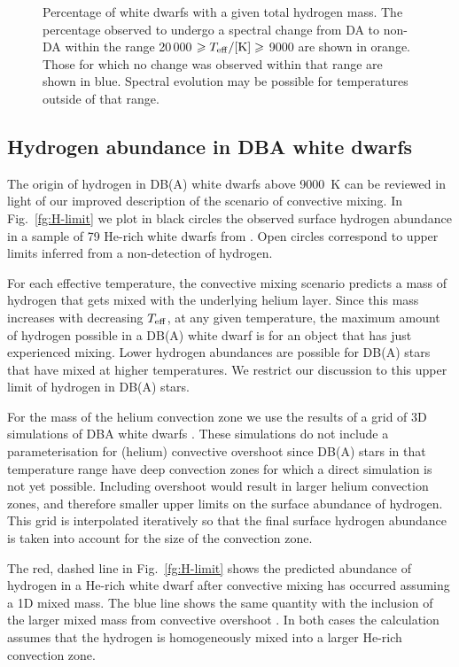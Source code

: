\documentclass[a4paper,fleqn,usenatbib]{mnras}
\begin{document}
\begin{figure}
 \centering
 \caption{Percentage of white dwarfs with a given total hydrogen mass. The percentage observed to undergo a spectral change from DA to non-DA within the range 20\,000 $\geqslant T_{\rm eff}/{\rm[K]} \geqslant$ 9000 are shown in orange. Those for which no change was observed within that range are shown in blue. Spectral evolution may be possible for temperatures outside of that range. }
 \label{fg:chunky-mass}
\end{figure}

\subsection{Hydrogen abundance in DBA white dwarfs}

The origin of hydrogen in DB(A) white dwarfs above 9000~K \citep{rolland18} can be reviewed in light of our improved description of the scenario of convective mixing. In Fig.~\ref{fg:H-limit} we plot in black circles the observed surface hydrogen abundance in a sample of 79 He-rich white dwarfs from \citet{rolland18}. Open circles correspond to upper limits inferred from a non-detection of hydrogen.

For each effective temperature, the convective mixing scenario predicts a mass of hydrogen that gets mixed with the underlying helium layer. Since this mass increases with decreasing $T_{\rm eff}$, at any given temperature, the maximum amount of hydrogen possible in a DB(A) white dwarf is for an object that has just experienced mixing. Lower hydrogen abundances are possible for DB(A) stars that have mixed at higher temperatures. We restrict our discussion to this upper limit of hydrogen in DB(A) stars.

For the mass of the helium convection zone we use the results of a grid of 3D simulations of DBA white dwarfs \citep{elena2}. These simulations do not include a parameterisation for (helium) convective overshoot since DB(A) stars in that temperature range have deep convection zones for which a direct simulation is not yet possible. Including overshoot would result in larger helium convection zones, and therefore smaller upper limits on the surface abundance of hydrogen. This grid is interpolated iteratively so that the final surface hydrogen abundance is taken into account for the size of the convection zone.


The red, dashed line in Fig.~\ref{fg:H-limit} shows the predicted abundance of hydrogen in a He-rich white dwarf after convective mixing has occurred assuming a 1D mixed mass. The blue line shows the same quantity with the inclusion of the larger mixed mass from convective overshoot \citep{cunningham19}. In both cases the calculation assumes that the hydrogen is homogeneously mixed into a larger He-rich convection zone.
\end{document}
